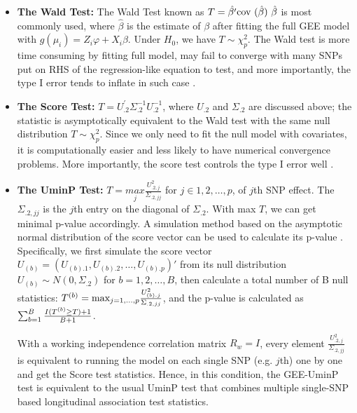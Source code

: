 \documentclass[12pt]{article}
\begin{document}
\begin{itemize}
\item \textbf{The Wald Test:} The Wald Test known as $T=\hat{\beta'}\text{cov (\ensuremath{\hat{\beta}}) }\hat{\beta}$ is most commonly used, where $\hat{\beta}$ is the estimate of $\beta$ after fitting the full GEE model with $g(\mu_i) = Z_i\varphi + X_i \beta$. Under $H_0$, we have $T \sim \chi_{p}^2$. The Wald test is more time consuming by fitting full model, may fail to converge with many SNPs put on RHS of the regression-like equation to test, and more importantly, the type I error tends to inflate in such case \cite{pan2014powerful,zhang2014testing}.
\item \textbf{The Score Test:} $T=U_{.2}^{'}\Sigma_{.2}^{-1}U_{.2}^{-1}$, where $U_{.2}$ and $\Sigma_{.2}$ are discussed above; the statistic is asymptotically equivalent to the Wald test with the same null distribution $T \sim \chi_{p}^2$. Since we only need to fit the null model with covariates, it is computationally easier and less likely to have numerical convergence
problems. More importantly, the score test controls the type I error well \cite{pan2014powerful,zhang2014testing}.
\item \textbf{The UminP Test: }$T=\underset{j}{max}\frac{U_{.2,j}^{2}}{\Sigma_{.2,jj}}$
for $j\in 1,2,\dots,p$, of $j$th SNP effect. The $\Sigma_{.2,jj}$ is the $j$th entry on the diagonal of $\Sigma_{.2}$. With max $T$, we can get minimal p-value accordingly.
A simulation method based on the asymptotic normal distribution of
the score vector can be used to calculate its p-value \cite{pan2014powerful,zhang2014testing}. Specifically, we first simulate the score vector $U_{(b)} = ( U_{(b).1}, U_{(b).2},\ldots, U_{(b).p} )'$ from its null distribution  $U_{(b)} \sim N(0, \Sigma_{.2} )$ for $b = 1, 2, \ldots, B$, then calculate a total number of B null statistics: $T^{(b)} = \textrm{max}_{j = 1,\ldots,p} { U^2_{(b).j} \over  \Sigma_{.2,jj} }$, and the p-value is calculated as $\sum_{b=1}^B { I(T^{(b)} \geq T ) + 1  \over B + 1 } $.

With a working independence correlation matrix $R_w = I$, every element $\frac{U_{.2,j}^{2}}{\Sigma_{.2,jj}}$ is equivalent to running the model on each single SNP (e.g. $j$th) one by one and get the Score test statistics. Hence, in this condition, the GEE-UminP test is equivalent to the usual UminP test that combines multiple single-SNP based longitudinal association test statistics.
\end{itemize}
\end{document}
